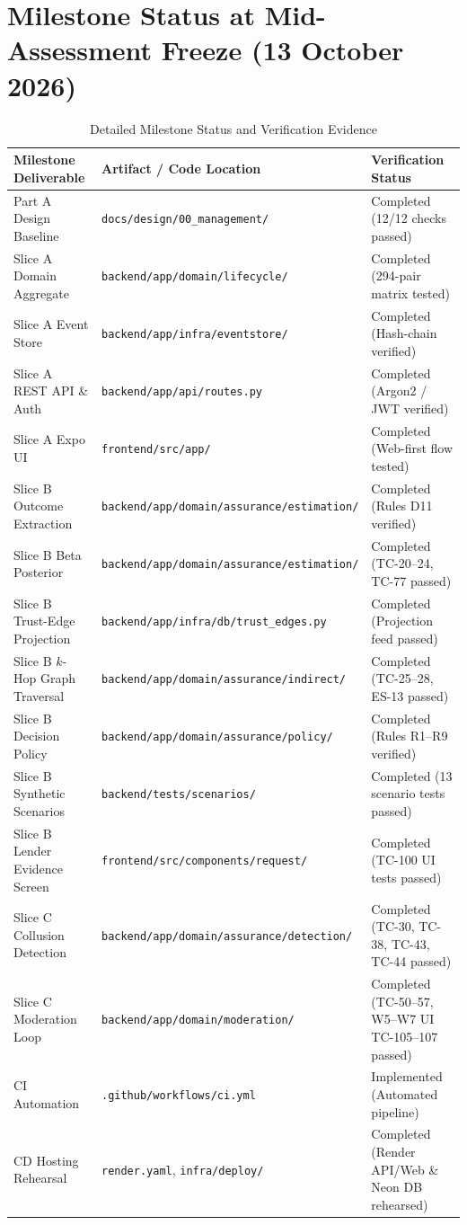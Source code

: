 \section{Milestone Status at Mid-Assessment Freeze (13 October 2026)}
\begin{table}[htbp]
\centering
\caption{Detailed Milestone Status and Verification Evidence}
\label{tab:milestone_status}
\small
\begin{tabularx}{\textwidth}{p{4.5cm} p{5.5cm} p{4.5cm}}
\toprule
\textbf{Milestone Deliverable} & \textbf{Artifact / Code Location} & \textbf{Verification Status} \\
\midrule
Part A Design Baseline & \texttt{docs/design/00\_management/} & Completed (12/12 checks passed) \\
Slice A Domain Aggregate & \texttt{backend/app/domain/lifecycle/} & Completed (294-pair matrix tested) \\
Slice A Event Store & \texttt{backend/app/infra/eventstore/} & Completed (Hash-chain verified) \\
Slice A REST API \& Auth & \texttt{backend/app/api/routes.py} & Completed (Argon2 / JWT verified) \\
Slice A Expo UI & \texttt{frontend/src/app/} & Completed (Web-first flow tested) \\
Slice B Outcome Extraction & \texttt{backend/app/domain/assurance/estimation/} & Completed (Rules D11 verified) \\
Slice B Beta Posterior & \texttt{backend/app/domain/assurance/estimation/} & Completed (TC-20--24, TC-77 passed) \\
Slice B Trust-Edge Projection & \texttt{backend/app/infra/db/trust\_edges.py} & Completed (Projection feed passed) \\
Slice B $k$-Hop Graph Traversal & \texttt{backend/app/domain/assurance/indirect/} & Completed (TC-25--28, ES-13 passed) \\
Slice B Decision Policy & \texttt{backend/app/domain/assurance/policy/} & Completed (Rules R1--R9 verified) \\
Slice B Synthetic Scenarios & \texttt{backend/tests/scenarios/} & Completed (13 scenario tests passed) \\
Slice B Lender Evidence Screen & \texttt{frontend/src/components/request/} & Completed (TC-100 UI tests passed) \\
Slice C Collusion Detection & \texttt{backend/app/domain/assurance/detection/} & Completed (TC-30, TC-38, TC-43, TC-44 passed) \\
Slice C Moderation Loop & \texttt{backend/app/domain/moderation/} & Completed (TC-50--57, W5--W7 UI TC-105--107 passed) \\
CI Automation & \texttt{.github/workflows/ci.yml} & Implemented (Automated pipeline) \\
CD Hosting Rehearsal & \texttt{render.yaml}, \texttt{infra/deploy/} & Completed (Render API/Web \& Neon DB rehearsed) \\
\bottomrule
\end{tabularx}
\end{table}

